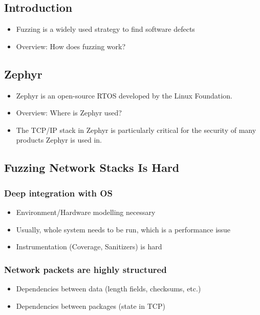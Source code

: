 \documentclass{article}
\begin{document}
\begin{multicols}{2}

  \section{Introduction}

  \begin{itemize}
    \item Fuzzing is a widely used strategy to find software defects
    \item Overview: How does fuzzing work?
  \end{itemize}

  \subsection{Zephyr}

  \begin{itemize}
    \item Zephyr is an open-source RTOS developed by the Linux Foundation.
    \item Overview: Where is Zephyr used?
    \item The TCP/IP stack in Zephyr is particularly critical for the security of many products Zephyr is used in.
  \end{itemize}

  \subsection{Fuzzing Network Stacks Is Hard}

  \subsubsection{Deep integration with OS}
  \begin{itemize}
    \item Environment/Hardware modelling necessary
    \item Usually, whole system needs to be run, which is a performance issue
    \item Instrumentation (Coverage, Sanitizers) is hard
  \end{itemize}

  \subsubsection{Network packets are highly structured}
  \begin{itemize}
    \item Dependencies between data (length fields, checksums, etc.)
    \item Dependencies between packages (state in TCP)
  \end{itemize}


\end{multicols}
\end{document}
